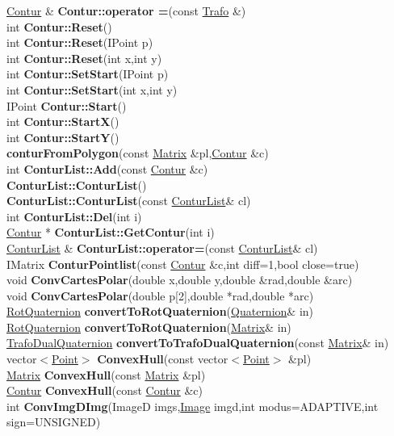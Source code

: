 \documentclass[10pt,titlepage]{article}
\def\functionlistentry#1#2#3#4#5#6{\noindent #1 {\bf #2}(#3) \dotfill #6\\}
\begin{document}
{{\functionlistentry{\hyperlink{Contur}{Contur} \&}{Contur::operator =}{const \hyperlink{Trafo}{Trafo} \&}{407}{conturs}{}
\functionlistentry{int}{Contur::Reset}{}{395}{conturs}{}
\functionlistentry{int}{Contur::Reset}{IPoint p}{396}{conturs}{}
\functionlistentry{int}{Contur::Reset}{int x,int y}{397}{conturs}{}
\functionlistentry{int}{Contur::SetStart}{IPoint p}{398}{conturs}{}
\functionlistentry{int}{Contur::SetStart}{int x,int y}{399}{conturs}{}
\functionlistentry{IPoint}{Contur::Start}{}{412}{conturs}{}
\functionlistentry{int}{Contur::StartX}{}{414}{conturs}{}
\functionlistentry{int}{Contur::StartY}{}{415}{conturs}{}
\functionlistentry{}{conturFromPolygon}{const \hyperlink{Matrix}{Matrix} \&pl,\hyperlink{Contur}{Contur} \&c}{463}{conturs}{}
\functionlistentry{int}{ConturList::Add}{const \hyperlink{Contur}{Contur} \&c}{456}{conturs}{}
\functionlistentry{}{ConturList::ConturList}{}{453}{conturs}{}
\functionlistentry{}{ConturList::ConturList}{const \hyperlink{ConturList}{ConturList}\& cl}{454}{conturs}{}
\functionlistentry{int}{ConturList::Del}{int i}{457}{conturs}{}
\functionlistentry{\hyperlink{Contur}{Contur} *}{ConturList::GetContur}{int i}{458}{conturs}{}
\functionlistentry{\hyperlink{ConturList}{ConturList} \&}{ConturList::operator=}{const \hyperlink{ConturList}{ConturList}\& cl}{455}{conturs}{}
\functionlistentry{IMatrix}{ConturPointlist}{const \hyperlink{Contur}{Contur} \&c,int diff=1,bool close=true}{429}{conturs}{}
\functionlistentry{void}{ConvCartesPolar}{double x,double y,double \&rad,double \&arc}{1366}{numeric}{}
\functionlistentry{void}{ConvCartesPolar}{double p[2],double *rad,double *arc}{1367}{numeric}{}
\functionlistentry{\hyperlink{RotQuaternion}{RotQuaternion}}{convertToRotQuaternion}{\hyperlink{Quaternion}{Quaternion}\& in}{1502}{quaternions}{}
\functionlistentry{\hyperlink{RotQuaternion}{RotQuaternion}}{convertToRotQuaternion}{\hyperlink{Matrix}{Matrix}\& in}{1503}{quaternions}{}
\functionlistentry{\hyperlink{TrafoDualQuaternion}{TrafoDualQuaternion}}{convertToTrafoDualQuaternion}{const \hyperlink{Matrix}{Matrix}\& in}{1538}{quaternions}{}
\functionlistentry{vector$<$\hyperlink{Point}{Point}$>$}{ConvexHull}{const vector$<$\hyperlink{Point}{Point}$>$ \&pl}{284}{datastructures}{}
\functionlistentry{\hyperlink{Matrix}{Matrix}}{ConvexHull}{const \hyperlink{Matrix}{Matrix} \&pl}{285}{datastructures}{}
\functionlistentry{\hyperlink{Contur}{Contur}}{ConvexHull}{const \hyperlink{Contur}{Contur} \&c}{286}{datastructures}{}
\functionlistentry{int}{ConvImgDImg}{ImageD imgs,\hyperlink{Image}{Image} imgd,int modus=ADAPTIVE,int sign=UNSIGNED}{85}{Images}{}
}}
\end{document}

